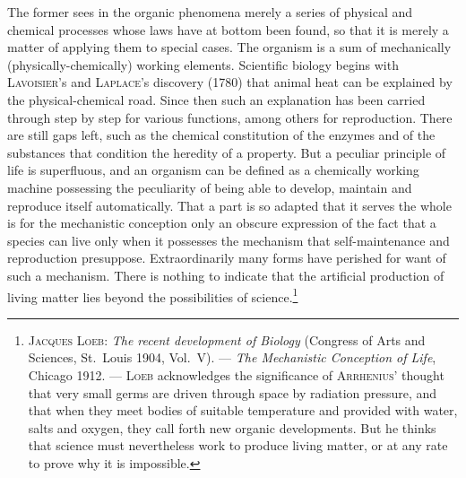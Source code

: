 \documentclass[12pt]{book}
\begin{document}
The former sees in the organic phenomena merely a series of physical and chemical
processes whose laws have at bottom been found, so that it is merely a matter of
applying them to special cases. The organism is a sum of mechanically
(physically-chemically) working elements. Scientific biology begins with
\textsc{Lavoisier}'s and \textsc{Laplace}'s discovery (1780) that animal heat can be
explained by the physical-chemical road. Since then such an explanation has been
carried through step by step for various functions, among others for reproduction.
There are still gaps left, such as the chemical constitution of the enzymes and of
the substances that condition the heredity of a property. But a peculiar principle of
life is superfluous, and an organism can be defined as a chemically working machine
possessing the peculiarity of being able to develop, maintain and reproduce itself
automatically. That a part is so adapted that it serves the whole is for the
mechanistic conception only an obscure expression of the fact that a species can live
only when it possesses the mechanism that self-maintenance and reproduction
presuppose. Extraordinarily many forms have perished for want of such a mechanism.
There is nothing to indicate that the artificial production of living matter lies
beyond the possibilities of science.\footnote{\textsc{Jacques Loeb}: \textit{The
recent development of Biology} (Congress of Arts and Sciences, St.\ Louis 1904,
Vol.\ V). --- \textit{The Mechanistic Conception of Life}, Chicago 1912. ---
\textsc{Loeb} acknowledges the significance of \textsc{Arrhenius}' thought that very
small germs are driven through space by radiation pressure, and that when they meet
bodies of suitable temperature and provided with water, salts and oxygen, they call
forth new organic developments. But he thinks that science must nevertheless work to
produce living matter, or at any rate to prove why it is impossible.}
\end{document}
